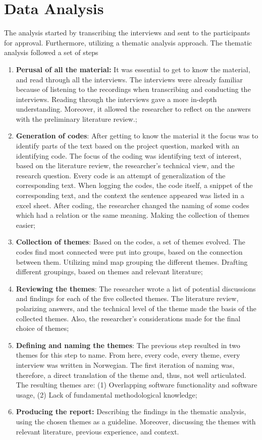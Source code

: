 \section{Data Analysis}
The analysis started by transcribing the interviews and sent to the participants for approval. Furthermore, utilizing a thematic analysis approach. The thematic analysis followed a set of steps

\begin{enumerate}
    \item { \bf Perusal of all the material:} It was essential to get to know the material, and read through all the interviews. The interviews were already familiar because of listening to the recordings when transcribing and conducting the interviews. Reading through the interviews gave a more in-depth understanding. Moreover, it allowed the researcher to reflect on the answers with the preliminary literature review.; 
    \item { \bf Generation of codes}: After getting to know the material it the focus was to identify parts of the text based on the project question, marked with an identifying code. The focus of the coding was identifying text of interest, based on the literature review, the researcher's technical view, and the research question. Every code is an attempt of generalization of the corresponding text. When logging the codes, the code itself, a snippet of the corresponding text, and the context the sentence appeared was listed in a excel sheet. After coding, the researcher changed the naming of some codes which had a relation or the same meaning. Making the collection of themes easier; 
    \item { \bf Collection of themes}: Based on the codes, a set of themes evolved. The codes find most connected were put into groups, based on the connection between them. Utilizing mind map grouping the different themes. Drafting different groupings, based on themes and relevant literature; 
    \item  { \bf Reviewing the themes}: The researcher wrote a list of potential discussions and findings for each of the five collected themes. The literature review, polarizing answers, and the technical level of the theme made the basis of the collected themes. Also, the researcher's considerations made for the final choice of themes; 
    \item { \bf Defining and naming the themes}: The previous step resulted in two themes for this step to name. From here, every code, every theme, every interview was written in Norwegian. The first iteration of naming was, therefore, a direct translation of the theme and, thus, not well articulated. The resulting themes are: (1) Overlapping software functionality and software usage, (2) Lack of fundamental methodological knowledge;
    \item { \bf Producing the report:} Describing the findings in the thematic analysis, using the chosen themes as a guideline. Moreover, discussing the themes with relevant literature, previous experience, and context.
\end{enumerate}

